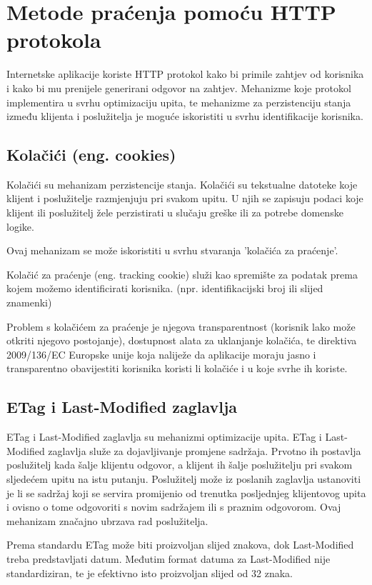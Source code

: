 \documentclass[times, utf8, zavrsni]{fer}
\begin{document}
\section{Metode praćenja pomoću HTTP protokola}
Internetske aplikacije koriste HTTP protokol kako bi primile zahtjev od
korisnika i kako bi mu prenijele generirani odgovor na zahtjev. Mehanizme koje
protokol implementira u svrhu optimizaciju upita, te mehanizme za perzistenciju
stanja između klijenta i poslužitelja je moguće iskoristiti u svrhu
identifikacije korisnika.

\subsection{Kolačići (eng. cookies)}
Kolačići su mehanizam perzistencije stanja.
Kolačići su tekstualne datoteke koje klijent i poslužitelje razmjenjuju pri
svakom upitu. U njih se zapisuju podaci koje klijent ili poslužitelj
žele perzistirati u slučaju greške ili za potrebe domenske logike.
\cite{nwg1999http}

Ovaj mehanizam se može iskoristiti u svrhu stvaranja 'kolačića za praćenje'.

Kolačić za praćenje (eng. tracking cookie) služi kao spremište za podatak
prema kojem možemo identificirati korisnika. (npr. identifikacijski broj ili
slijed znamenki)

Problem s kolačićem za praćenje je njegova transparentnost (korisnik
lako može otkriti njegovo postojanje), dostupnost alata za uklanjanje
kolačića, te direktiva 2009/136/EC Europske unije \cite{eurlex2019ec136}
koja naliježe da
aplikacije moraju jasno i transparentno obavijestiti korisnika koristi li
kolačiće i u koje svrhe ih koriste.

\subsection{ETag i Last-Modified zaglavlja}
ETag i Last-Modified zaglavlja su mehanizmi optimizacije upita.
ETag i Last-Modified zaglavlja služe za dojavljivanje promjene sadržaja.
Prvotno ih postavlja poslužitelj kada šalje klijentu odgovor, a klijent ih
šalje poslužitelju pri svakom sljedećem upitu na istu putanju. Poslužitelj
može iz poslanih zaglavlja ustanoviti je li se sadržaj koji se servira
promijenio od trenutka posljednjeg klijentovog upita i ovisno o tome
odgovoriti s novim sadržajem ili s praznim odgovorom. Ovaj mehanizam
značajno ubrzava rad poslužitelja.

Prema standardu ETag može biti proizvoljan slijed znakova, dok Last-Modified
treba predstavljati datum. Međutim format datuma za Last-Modified nije
standardiziran, te je efektivno isto proizvoljan slijed od 32 znaka.
\end{document}

